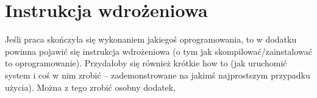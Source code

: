 \chapter{Instrukcja wdrożeniowa}
Jeśli praca skończyła się wykonaniem jakiegoś oprogramowania, to w dodatku powinna pojawić się instrukcja wdrożeniowa (o tym jak skompilować/zainstalować to oprogramowanie).
Przydałoby się również  krótkie how to (jak uruchomić system i coś w nim zrobić -- zademonstrowane na jakimś najprostszym przypadku użycia). Można z tego zrobić osobny dodatek,